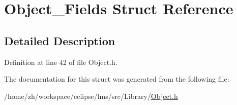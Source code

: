 \hypertarget{structObject__Fields}{\section{Object\-\_\-\-Fields Struct Reference}
\label{structObject__Fields}
}


\subsection{Detailed Description}


Definition at line 42 of file Object.\-h.



The documentation for this struct was generated from the following file\-:\begin{DoxyCompactItemize}
\item 
/home/zh/workspace/eclipse/lms/src/\-Library/\hyperlink{Object_8h}{Object.\-h}\end{DoxyCompactItemize}
